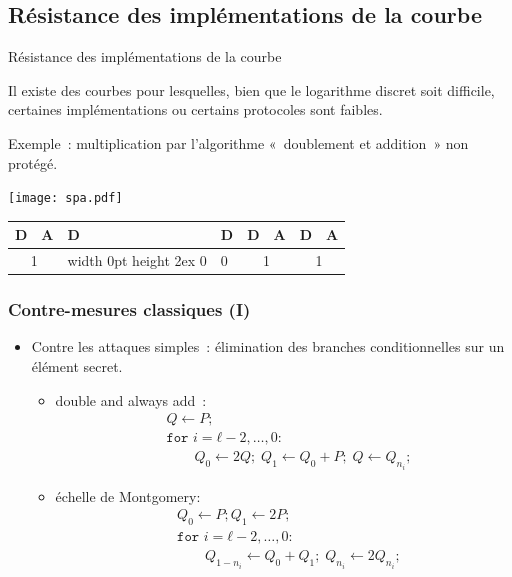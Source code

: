 \documentclass[francais]{beamer}
\begin{document}
\subsection{Résistance des implémentations de la courbe}
\begin{frame}{Résistance des implémentations de la courbe}
\begin{block}{}
Il existe des courbes pour lesquelles,
bien que le logarithme discret soit difficile,
certaines implémentations ou certains protocoles sont faibles.
\end{block}
Exemple : multiplication par l'algorithme « doublement et addition »
non protégé.
\begin{center}
\hspace*{.5em}\texttt{[image: spa.pdf]}

 \begin{tabular}{*{8}{|p{1.7em}}|} 
 \hline
 D&A&D&D& D&A&D&A\\
 \hline
  &
 \vrule width 0pt height 2ex
 0 & 0 &  &  \\
 \hline
 \end{tabular}
\end{center}
\end{frame}
\begin{frame}\frametitle{Contre-mesures classiques (I)}
\begin{itemize}
\item Contre les attaques simples :
élimination des branches conditionnelles sur un élément secret.
\begin{itemize}
\item double and always add :
\[ \begin{split}
&Q ← P;\\
&\texttt{for $i = ℓ-2,…,0$:}\\
&\qquad Q_0 ← 2 Q;\; Q_1 ← Q_0 + P;\; Q ← Q_{n_i};
\end{split} \]
\item échelle de Montgomery:
\[\begin{split}
&Q_0 ← P; Q_1 ← 2P;\\
&\texttt{for $i = ℓ-2,…,0$:}\\
&\qquad Q_{1-n_i} ← Q_0 + Q_1;\; Q_{n_i} ← 2 Q_{n_i};
\end{split}\]
\end{itemize}
\end{itemize}
\end{frame}
\end{document}
